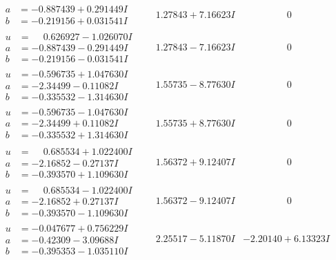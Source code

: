 \documentclass[1p]{elsarticle_modified}
\theoremstyle{definition}
\begin{document}
$$\begin{array}{c|c|c}
\begin{aligned}
a &= -0.887439 + 0.291449 I \\
b &= -0.219156 + 0.031541 I\end{aligned}
 & \phantom{-}1.27843 + 7.16623 I & \phantom{-0.000000 } 0 \\ \hline\begin{aligned}
u &= \phantom{-}0.626927 - 1.026070 I \\
a &= -0.887439 - 0.291449 I \\
b &= -0.219156 - 0.031541 I\end{aligned}
 & \phantom{-}1.27843 - 7.16623 I & \phantom{-0.000000 } 0 \\ \hline\begin{aligned}
u &= -0.596735 + 1.047630 I \\
a &= -2.34499 - 0.11082 I \\
b &= -0.335532 - 1.314630 I\end{aligned}
 & \phantom{-}1.55735 - 8.77630 I & \phantom{-0.000000 } 0 \\ \hline\begin{aligned}
u &= -0.596735 - 1.047630 I \\
a &= -2.34499 + 0.11082 I \\
b &= -0.335532 + 1.314630 I\end{aligned}
 & \phantom{-}1.55735 + 8.77630 I & \phantom{-0.000000 } 0 \\ \hline\begin{aligned}
u &= \phantom{-}0.685534 + 1.022400 I \\
a &= -2.16852 - 0.27137 I \\
b &= -0.393570 + 1.109630 I\end{aligned}
 & \phantom{-}1.56372 + 9.12407 I & \phantom{-0.000000 } 0 \\ \hline\begin{aligned}
u &= \phantom{-}0.685534 - 1.022400 I \\
a &= -2.16852 + 0.27137 I \\
b &= -0.393570 - 1.109630 I\end{aligned}
 & \phantom{-}1.56372 - 9.12407 I & \phantom{-0.000000 } 0 \\ \hline\begin{aligned}
u &= -0.047677 + 0.756229 I \\
a &= -0.42309 - 3.09688 I \\
b &= -0.395353 - 1.035110 I\end{aligned}
 & \phantom{-}2.25517 - 5.11870 I & -2.20140 + 6.13323 I \\ \hline\begin{aligned}

\end{aligned}
\end{array}$$
\end{document}
